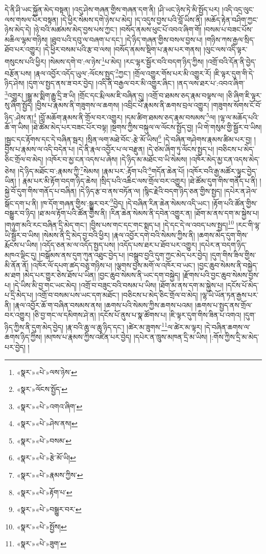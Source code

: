 དེ་ནི་ཤི་ཡང་སྐྱོན་མེད་བསྟན། །འདུ་ཤེས་གཞན་གྱིས་གཞན་དག་ནི། །ཤི་ཡང་ཉེས་ཏེ་མི་སྤྱོད་པར། །འདི་འདྲ་ལུང་ལས་གསལ་པོར་བསྟན། །དེ་ཕྱིར་སེམས་དགེ་ཉེས་པ་མེད། །ད་འདུས་བྱས་པའི་བློ་ཡིས་ནི། །མཆོད་རྟེན་བཤིག་ཀྱང་ཉེས་མེད་དེ། །ཉེ་བའི་མཚམས་མེད་བྱས་པས་ཀྱང་། །བསོད་ནམས་ཕུང་པོ་འབའ་ཞིག་གོ། །བསམ་པ་བཟང་པོས་མཆིལ་ལྷམ་གཉིས། །ཐུབ་པའི་དབུ་ལ་བཞག་པ་དང་། །དེ་ཉིད་གཞན་གྱིས་བསལ་བྱས་པ། །གཉིས་ཀས་རྒྱལ་སྲིད་ཐོབ་པར་འགྱུར། །དེ་ཕྱིར་བསམ་པའི་རྩ་བ་ལས། །བསོད་ནམས་སྡིག་པ་རྣམ་པར་གནས། །ལུང་ལས་འདི་ལྟར་གསུངས་པའི་ཕྱིར། །སེམས་དགེ་བ་:ལ་ཉེས་\footnote{«སྣར་»«པེ་»ལས་ཉེས་}པ་མེད། །རང་ལྷར་སྦྱོར་བའི་བདག་ཉིད་ཀྱིས། །འགྲོ་བའི་དོན་ནི་བྱེད་བརྩོན་པས། །རྣལ་འབྱོར་འདོད་ཡུལ་:ལོངས་སྤྱད་\footnote{«སྣར་»ལོངས་སྤྱོད་}ཀྱང་། །གྲོལ་འགྱུར་གོས་པར་མི་འགྱུར་རོ། །ཇི་ལྟར་དུག་གི་དེ་ཉིད་ཤེས། །དུག་ལ་སྤྱད་ནས་ཟ་བར་བྱེད། །འདི་ནི་བརྒྱལ་བར་མི་འགྱུར་ཞིང་། །ནད་ལས་ཐར་པ་:འབའ་ཞིག་\footnote{«སྣར་»«པེ་»འགའ་ཞིག་}འགྱུར། །སྒྱུ་མ་སྨིག་རྒྱུ་དྲི་ཟ་ཡི། །གྲོང་དང་རྨི་ལམ་ཇི་བཞིན་དུ། །འགྲོ་བ་ཐམས་ཅད་རྣམ་བལྟས་ལ། །ཅི་ཞིག་ཇི་ལྟར་སུ་ཞིག་སྤྱོད། །བྱིས་པ་རྣམས་ནི་གཟུགས་ལ་ཆགས། །འབྲིང་པོ་རྣམས་ནི་ཆགས་བྲལ་འགྱུར། །གཟུགས་སོགས་ངོ་བོ་ཉིད་:ཤེས་ན།\footnote{«སྣར་»«པེ་»ཤེས་ནས།} །བློ་མཆོག་རྣམས་ནི་གྲོལ་བར་འགྱུར། །དམ་ཚིག་ཐམས་ཅད་རྣམ་བསམས་\footnote{«སྣར་»«པེ་»བསམ་}ལ། །ལྷ་ལ་མཆོད་པའི་ཆོ་ག་ཡིས། །ཐེ་ཚོམ་མེད་པར་བཟང་པོར་བལྟ། །སྔགས་ཀྱིས་བསྐུལ་ལ་ལོངས་སྤྱོད་བྱ། །ཡི་གེ་གསུམ་གྱི་སྦྱོར་བ་ཡིས། །སྦྱང་དང་རྟོགས་དང་དེ་བཞིན་སྦར། །སྲིན་ལག་མཐེ་བོང་:རྩེ་མོ་ཡིས།\footnote{«སྣར་»«པེ་»རྩེ་མོ་ཡི།} །དེ་བཞིན་གཤེགས་རྣམས་ཚིམ་པར་བྱ། །བྱིས་པ་རྣམས་ལ་འདི་བདེན་པ། །དེ་ནི་རྣལ་འབྱོར་པ་ལ་བརྫུན། །དེ་ཙམ་ཞིག་ཏུ་ལོངས་སྤྱད་པ། །བཅིངས་པ་མེད་ཅིང་གྲོལ་བ་མེད། །འཁོར་བ་མྱ་ངན་འདས་པ་ཞེས། །དེ་ཉིད་མ་མཐོང་བ་ཡི་སེམས། །འཁོར་མེད་མྱ་ངན་འདས་མེད་ཅེས། །དེ་ཉིད་མཐོང་བ་:རྣམས་ཀྱི་\footnote{«སྣར་»«པེ་»རྣམས་ཀྱིས་}སེམས། །རྣམ་པར་:རྟོག་པའི་\footnote{«སྣར་»«པེ་»རྟོག་པ་}གདོན་ཆེན་པོ། །འཁོར་བའི་རྒྱ་མཚོར་ལྟུང་བྱེད་ཡིན། །
རྣམ་པར་མི་རྟོག་བདག་ཉིད་ཆེས། །སྲིད་པའི་འཆིང་ལས་གྲོལ་བར་འགྱུར། །ཐེ་ཚོམ་དུག་གིས་གནོད་པ་ནི། །སྐྱེ་བོ་དུག་གིས་གནོད་པ་བཞིན། །དེ་ཉིད་རྩ་བ་ནས་བཏོན་ལ། །སྙིང་རྗེའི་བདག་ཉིད་ཅན་གྱིས་སྤྱད། །དཔེར་ན་ཤེལ་སྒོང་དག་པ་ནི། །ཁ་དོག་གཞན་གྱིས་:སྒྱུར་བར་\footnote{«སྣར་»«པེ་»བསྒྱུར་བར་}བྱེད། །དེ་བཞིན་རིན་ཆེན་སེམས་འདི་ཡང་། །རྟོག་པའི་ཚོན་གྱིས་བསྒྱུར་བ་ཉིད། །ཐ་མལ་རྟོག་པའི་ཚོན་གྱིས་ནི། །རིན་ཆེན་སེམས་ནི་དབེན་འགྱུར་ན། །ཐོག་མ་ནས་དག་མ་སྐྱེས་པ། །གཉུག་མའི་རང་བཞིན་དྲི་མེད་གང་། །བྱིས་པས་གང་དང་གང་སྨད་པ། །དེ་དང་དེ་ལ་འབད་པས་སྤྱད།\footnote{«སྣར་»«པེ་»སྤྱོས།} །རང་གི་ལྷ་ཡི་སྦྱོར་བ་ཡིས། །སེམས་ནི་དྲི་མེད་བྱ་བའི་ཕྱིར། །རྣལ་འབྱོར་དགེ་བའི་སེམས་ཀྱིས་ནི། །ཆགས་མེད་དུག་གིས་རྨོངས་པ་ཡིས། །འདོད་ཅན་མ་ལ་འདོད་སྤྱད་པས། །འདོད་པས་ཐར་པ་ཐོབ་པར་འགྱུར། །དཔེར་ན་བདག་ཉིད་མཁའ་ལྡིང་དུ། །བསྒོམས་ནས་དུག་ཀུན་འཐུང་བྱེད་པ། །བསྒྲུབ་བྱའི་དུག་ཀྱང་མེད་པར་བྱེད། །དུག་གིས་ཟིལ་གྱིས་མི་ནོན་ནོ། །འཁོར་ལོ་དཔག་ཚད་བཅུ་གཉིས་པ། །ལྕགས་བྱས་མགོ་ལ་འཁོར་བ་ཡང་། །བྱང་ཆུབ་སེམས་ནི་བསྐྱེད་མ་ཐག །མེད་པར་གྱུར་ཅེས་ཐོས་པ་ཡིན། །བྱང་ཆུབ་སེམས་ནི་ཡང་དག་བསྐྱེད། །རྫོགས་པའི་བྱང་ཆུབ་སེམས་བྱས་པ། །དེ་ཡིས་མི་བྱ་གང་ཡང་མེད། །འགྲོ་བ་བཟུང་བའི་བསམ་པ་ཡིས། །ཐོག་མ་ནས་དག་མ་སྐྱེས་པ། །དངོས་པོ་མེད་པ་དྲི་མེད་པ། །འགྲོ་བ་བསམ་པས་ཡང་དག་མཐོང་། །བཅིངས་པ་མེད་ཅིང་གྲོལ་བ་མེད། །ལྷ་ཡི་ཡོན་ཏན་རྒྱས་པར་ནི། །རྣལ་འབྱོར་ཆོ་ག་བཞིན་བསམས་ནས། །ཆགས་པའི་སེམས་ཀྱིས་ཆགས་པའམ། །ཆགས་པ་སྤྱད་ནས་གྲོལ་བར་འགྱུར། །ཅི་བྱ་གང་ལ་དམིགས་ཤེ་ན། །དངོས་པོ་ནུས་པ་སྣ་ཚོགས་པ། །ཇི་ལྟར་དུག་གིས་ཟིན་པ་འགའ། །དུག་ཉིད་ཀྱིས་ནི་དུག་མེད་བྱེད། །རྣ་བའི་ཆུ་ལ་ཆུ་ཉིད་དང་། །ཚེར་མ་ཟུགས་\footnote{«སྣར་»«པེ་»ཟུག་}ལ་ཚེར་མ་ལྟར། །དེ་བཞིན་ཆགས་ལ་ཆགས་ཉིད་ཀྱིས། །མཁས་པ་རྣམས་ཀྱིས་འཛིན་པར་བྱེད། །དཔེར་ན་ཁྲུས་མཁན་དྲི་མ་ཡིས། །:གོས་ཀྱིས་དྲི་མ་མེད་པར་བྱེད། །
